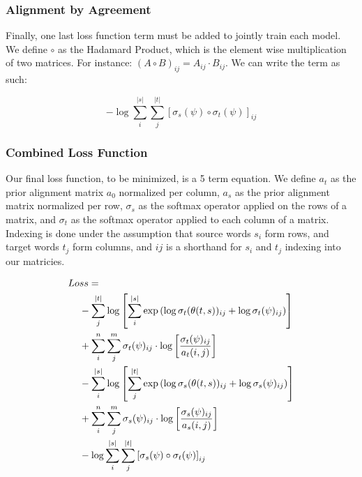 \documentclass[twoside,twocolumn]{article}
\begin{document}
\subsubsection{Alignment by Agreement}
Finally, one last loss function term must be added to jointly train each model. We define $\circ$ as the Hadamard Product, which is the element wise multiplication of two matrices. For instance: $(A \circ B)_{ij} = A_{ij} \cdot B_{ij}$. We can write the term as such:

\begin{equation}
  -\log \sum_i^{|s|} \sum_j^{|t|} \left[ \sigma_s(\psi) \circ \sigma_t(\psi) \right]_{ij}
\end{equation}


\subsubsection{Combined Loss Function}
Our final loss function, to be minimized, is a 5 term equation. We define $a_t$ as the prior alignment matrix $a_0$ normalized per column, $a_s$ as the prior alignment matrix normalized per row, $\sigma_s$ as the softmax operator applied on the rows of a matrix, and $\sigma_t$ as the softmax operator applied to each column of a matrix. Indexing is done under the assumption that source words $s_i$ form rows, and target words $t_j$ form columns, and $ij$ is a shorthand for $s_i$ and $t_j$ indexing into our matricies.

\begin{equation}
  \centering
\begin{split}
  Lo&ss = \\
  &- \sum_j^{|t|} \log \left[ \sum_i^{|s|} \exp \left( \log \sigma_t(\theta(t, s))_{ij} + \log \sigma_t(\psi)_{ij} \right) \right] \\
  &+ \sum_i^n \sum_j^m \sigma_t(\psi)_{ij}  \cdot \log \left[ \frac{\sigma_t(\psi)_{ij}}{a_t(i, j)} \right] \\
  &- \sum_i^{|s|} \log \left[ \sum_j^{|t|} \exp \left( \log \sigma_s(\theta(t, s))_{ij} + \log \sigma_s(\psi)_{ij} \right) \right] \\
  &+ \sum_i^n \sum_j^m \sigma_s(\psi)_{ij}  \cdot \log \left[ \frac{\sigma_s(\psi)_{ij}}{a_s(i, j)} \right] \\
  &- \log \sum_i^{|s|} \sum_j^{|t|} \left[ \sigma_s(\psi) \circ \sigma_t(\psi) \right]_{ij} \\
\end{split}
\end{equation}
\end{document}
